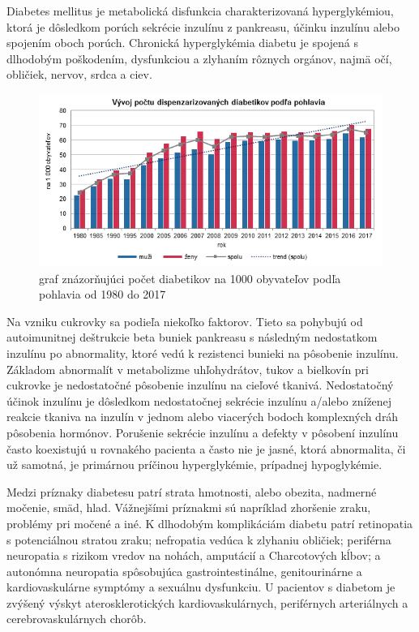 Diabetes mellitus je metabolická disfunkcia charakterizovaná hyperglykémiou, ktorá je dôsledkom porúch sekrécie inzulínu z pankreasu, účinku inzulínu alebo spojením oboch porúch.\cite{2004}
Chronická hyperglykémia diabetu je spojená s dlhodobým poškodením, dysfunkciou a zlyhaním rôznych orgánov, najmä očí, obličiek, nervov, srdca a ciev.

\begin{figure}[h]
\includegraphics[scale=0.8]{pocet_diabetikov.png}
\caption{graf znázorňujúci počet diabetikov na 1000 obyvateľov podľa pohlavia od 1980 do 2017 \cite{2018}}
\end{figure}

Na vzniku cukrovky sa podieľa niekoľko faktorov. Tieto sa pohybujú od autoimunitnej deštrukcie beta buniek pankreasu s následným nedostatkom inzulínu po abnormality, ktoré vedú k rezistenci bunieki na pôsobenie inzulínu.
Základom abnormalít v metabolizme uhľohydrátov, tukov a bielkovín pri cukrovke je nedostatočné pôsobenie inzulínu na cieľové tkanivá. Nedostatočný účinok inzulínu je dôsledkom nedostatočnej sekrécie inzulínu a/alebo zníženej reakcie tkaniva na inzulín v jednom alebo viacerých bodoch komplexných dráh pôsobenia hormónov. Porušenie sekrécie inzulínu a defekty v pôsobení inzulínu často koexistujú u rovnakého pacienta a často nie je jasné, ktorá abnormalita, či už samotná, je primárnou príčinou hyperglykémie, prípadnej hypoglykémie.\cite{2004}

Medzi príznaky diabetesu patrí strata hmotnosti, alebo obezita, nadmerné močenie, smäd, hlad. Vážnejšími príznakmi sú napríklad zhoršenie zraku, problémy pri močené a iné.
K dlhodobým komplikáciám diabetu patrí retinopatia s potenciálnou stratou zraku; nefropatia vedúca k zlyhaniu obličiek; periférna neuropatia s rizikom vredov na nohách, amputácií a Charcotových kĺbov; a autonómna neuropatia spôsobujúca gastrointestinálne, genitourinárne a kardiovaskulárne symptómy a sexuálnu dysfunkciu. U pacientov s diabetom je zvýšený výskyt aterosklerotických kardiovaskulárnych, periférnych arteriálnych a cerebrovaskulárnych chorôb.\cite{2004}

